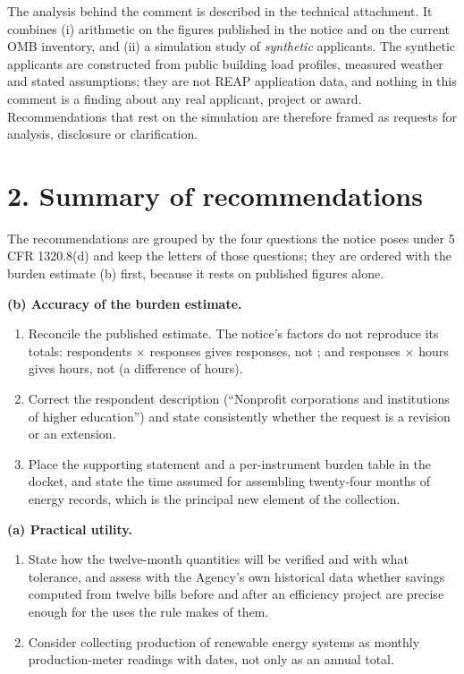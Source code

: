 \documentclass[11pt]{article}
\begin{document}
The analysis behind the comment is described in the technical attachment. It combines
(i) arithmetic on the figures published in the notice and on the current OMB inventory,
and (ii) a simulation study of \NApplicants{} \emph{synthetic} applicants. The synthetic
applicants are constructed from public building load profiles, measured weather and
stated assumptions; they are not REAP application data, and nothing in this comment is a
finding about any real applicant, project or award. Recommendations that rest on the
simulation are therefore framed as requests for analysis, disclosure or clarification.

\section*{2. Summary of recommendations}

The recommendations are grouped by the four questions the notice poses under
5 CFR 1320.8(d) and keep the letters of those questions; they are ordered with the burden
estimate (b) first, because it rests on published figures alone.

\textbf{(b) Accuracy of the burden estimate.}
\begin{enumerate}
\item[B1.] Reconcile the published estimate. The notice's factors do not reproduce its
totals: \AuditRespondents{} respondents $\times$ \AuditResponsesPerRespondent{} responses
gives \AuditProductResponses{} responses, not \AuditResponses; and \AuditResponses{}
responses $\times$ \AuditHoursPerResponse{} hours gives \AuditProductHours{} hours, not
\AuditTotalHours{} (a difference of \AuditHoursDiscrepancy{} hours).
\item[B2.] Correct the respondent description (``Nonprofit corporations and institutions
of higher education'') and state consistently whether the request is a revision or an
extension.
\item[B3.] Place the supporting statement and a per-instrument burden table in the docket,
and state the time assumed for assembling twenty-four months of energy records, which is
the principal new element of the collection.
\end{enumerate}

\textbf{(a) Practical utility.}
\begin{enumerate}
\item[A1.] State how the twelve-month quantities will be verified and with what
tolerance, and assess with the Agency's own historical data whether savings computed
from twelve bills before and after an efficiency project are precise enough for the
uses the rule makes of them.
\item[A2.] Consider collecting production of renewable energy systems as monthly
production-meter readings with dates, not only as an annual total.
\end{enumerate}
\end{document}
